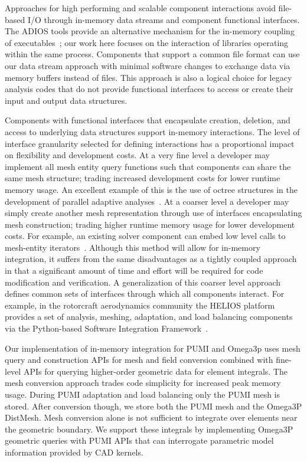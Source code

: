 \documentclass[a4paper]{article}
\begin{document}
Approaches for high performing and scalable component interactions avoid
file-based I/O through in-memory data streams and component functional
interfaces.
The ADIOS tools provide an alternative mechanism for the in-memory coupling of
executables~\cite{bennett2012combining,zhang2012enabling}; our work here focuses
on the interaction of libraries operating within the same process.
Components that support a common file format can use our data stream approach
with minimal software changes to exchange data via memory buffers instead of files.
This approach is also a logical choice for legacy analysis codes that do not
provide functional interfaces to access or create their input and output data
structures.

Components with functional interfaces that encapsulate creation, deletion, and
access to underlying data structures support in-memory interactions.
The level of interface granularity selected for defining interactions has a
proportional impact on flexibility and development costs.
At a very fine level a developer may implement all mesh entity query functions such
that components can share the same mesh structure; trading increased development
costs for lower runtime memory usage.
An excellent example of this is the use of octree structures in the
development of parallel adaptive analyses~\cite{BursteddeWilcoxGhattas11}.
At a coarser level a developer may simply create another mesh
representation through use of interfaces encapsulating mesh construction;
trading higher runtime memory usage for lower development costs.
For example, an existing solver component can embed low level
calls to mesh-entity iterators~\cite{Ollivier10}.
Although this method will allow for in-memory integration, it suffers from the
same disadvantages as a tightly coupled approach in that a significant amount of
time and effort will be required for code modification and verification.
A generalization of this coarser level approach defines common sets of
interfaces through which all components interact.
For example, in the rotorcraft aerodynamics community the HELIOS platform
provides a set of analysis, meshing, adaptation, and load balancing components
via the Python-based Software Integration Framework~\cite{sankaran2010application}.

Our implementation of in-memory integration for PUMI and Omega3p uses
mesh query and construction APIs for mesh and field conversion combined with
fine-level APIs for querying higher-order geometric data for element
integrals.
The mesh conversion approach trades code simplicity for increased peak memory usage.
During PUMI adaptation and load balancing only the PUMI mesh is stored.
After conversion though, we store both the PUMI mesh and the Omega3P
DistMesh.
Mesh conversion alone is not sufficient to integrate over elements near the
geometric boundary.
We support these integrals by implementing Omega3P geometric queries with PUMI
APIs that can interrogate parametric model information provided by CAD
kernels.
\end{document}
